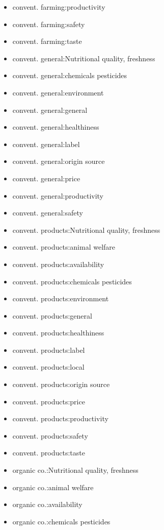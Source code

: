 \begin{multicols}{2}
\begin{itemize}[leftmargin=*]
        \item[] convent. farming:productivity 
        \item[] convent. farming:safety
        \item[] convent. farming:taste 
        \item[] convent. general:Nutritional quality, freshness 
        \item[] convent. general:chemicals pesticides 
        \item[] convent. general:environment
        \item[] convent. general:general
        \item[] convent. general:healthiness
        \item[] convent. general:label 
        \item[] convent. general:origin source 
        \item[] convent. general:price 
        \item[] convent. general:productivity 
        \item[] convent. general:safety
        \item[] convent. products:Nutritional quality, freshness
        \item[] convent. products:animal welfare
        \item[] convent. products:availability 
        \item[] convent. products:chemicals pesticides 
        \item[] convent. products:environment 
        \item[] convent. products:general 
        \item[] convent. products:healthiness 
        \item[] convent. products:label
        \item[] convent. products:local
        \item[] convent. products:origin source
        \item[] convent. products:price
        \item[] convent. products:productivity 
        \item[] convent. products:safety
        \item[] convent. products:taste
        \item[] organic co.:Nutritional quality, freshness
        \item[] organic co.:animal welfare
        \item[] organic co.:availability 
        \item[] organic co.:chemicals pesticides 

\end{itemize}
\end{multicols}
